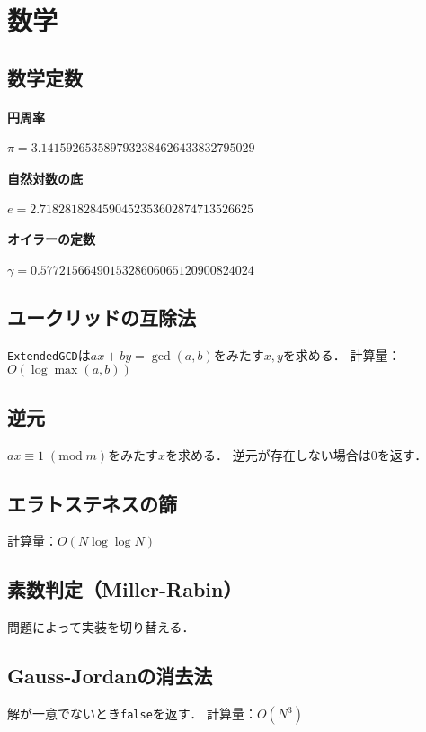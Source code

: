 \documentclass[landscape,twocolumn,9pt]{jsarticle}
\begin{document}
\section{数学}%
\subsection{数学定数}
\paragraph{円周率} \hspace{12.16mm}
$ \pi=   3.1415926535897932384626433832795029 $
\paragraph{自然対数の底} \hspace{2.66mm}
$ e=     2.7182818284590452353602874713526625 $
\paragraph{オイラーの定数}
$ \gamma=0.5772156649015328606065120900824024 $

\subsection{ユークリッドの互除法}
\texttt{ExtendedGCD}は$ax+by=\gcd(a,b)$をみたす$x,y$を求める．
計算量：$O(\log\max(a,b))$


\subsection{逆元}
$ax\equiv 1\; (\mathrm{mod}\; m)$をみたす$x$を求める．
逆元が存在しない場合は0を返す．


\subsection{エラトステネスの篩}
計算量：$O(N\log\log N)$


\subsection{素数判定（Miller-Rabin）}
問題によって実装を切り替える．


\subsection{Gauss-Jordanの消去法}
解が一意でないとき\texttt{false}を返す．
計算量：$O(N^3)$

\end{document}
